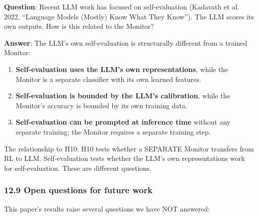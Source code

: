 \documentclass[
]{article}
\begin{document}
\textbf{Question}: Recent LLM work has focused on self-evaluation
(Kadavath et al. 2022, ``Language Models (Mostly) Know What They
Know''). The LLM scores its own outputs. How is this related to the
Monitor?

\textbf{Answer}: The LLM's own self-evaluation is structurally different
from a trained Monitor:

\begin{enumerate}
\def\labelenumi{\arabic{enumi}.}
\item
  \textbf{Self-evaluation uses the LLM's own representations}, while the
  Monitor is a separate classifier with its own learned features.
\item
  \textbf{Self-evaluation is bounded by the LLM's calibration}, while
  the Monitor's accuracy is bounded by its own training data.
\item
  \textbf{Self-evaluation can be prompted at inference time} without any
  separate training; the Monitor requires a separate training step.
\end{enumerate}

The relationship to H10: H10 tests whether a SEPARATE Monitor transfers
from RL to LLM. Self-evaluation tests whether the LLM's own
representations work for self-evaluation. These are different questions.

\subsubsection{12.9 Open questions for future
work}\label{open-questions-for-future-work}

This paper's results raise several questions we have NOT answered:
\end{document}
